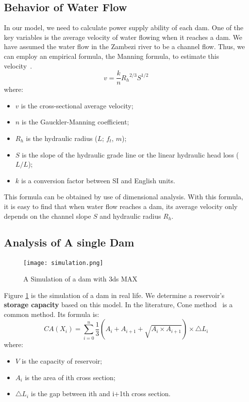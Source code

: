 \documentclass{mcmthesis}
\begin{document}
\subsection{Behavior of Water Flow}%
In our model, we need to calculate power supply ability of each dam. One of the key variables is the average velocity of water flowing when it reaches a dam. We have assumed the water flow in the Zambezi river to be a channel flow. Thus, we can employ an empirical formula, the Manning formula, to estimate this velocity~\cite{Wiki_Manning}.
\begin{equation}
\label{eq:Manning}
v=\frac{k}{n} {R_h}^{2/3} S^{1/2}
\end{equation}
where:
\begin{itemize}
\item $v$ is the cross-sectional average velocity;
\item $n$ is the Gauckler-Manning coefficient;
\item $R_h$ is the hydraulic radius ($L$; $f_t$, $m$);
\item $S$ is the slope of the hydraulic grade line or the linear hydraulic head loss ($L/L$);
\item $k$ is a conversion factor between SI and English units.
\end{itemize}

This formula can be obtained by use of dimensional analysis. With this formula, it is easy to find that when water flow reaches a dam, its average velocity only depends on the channel slope $S$ and hydraulic radius $R_h$.
\subsection{Analysis of A single Dam}\label{Sec:single}
\begin{figure}[h]
    \centering
    \texttt{[image: simulation.png]}
    \caption{A Simulation of a dam with 3ds MAX}
    \label{fig:3ds}
\end{figure}
Figure \ref{fig:3ds} is the simulation of a dam in real life. We determine a reservoir's \textbf{storage capacity} based on this model. In the literature, Cone method~\cite{Edu_Reservoir} is a common method. Its formula is:
$$CA(X_i) = \sum_{i=0}^n\frac{1}{3}(A_i+A_{i+1}+\sqrt{A_i \times A_{i+1}})\times \bigtriangleup L_i$$
where:
\begin{itemize}
\item $V$ is the capacity of reservoir;
\item $A_i$ is the area of ith cross section;
\item  $\bigtriangleup L_i$ is the gap between ith and i+1th cross section.
\end{itemize}
\end{document}
